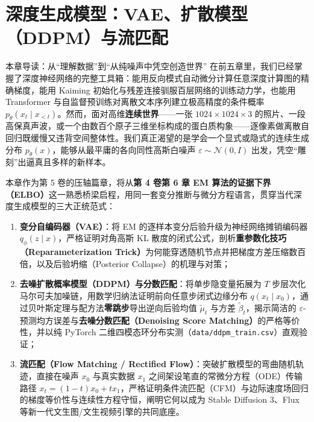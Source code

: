 \chapter[深度生成：VAE、扩散与流匹配]{深度生成模型：VAE、扩散模型（DDPM）与流匹配}
\label{ch:vae-diffusion-flow}


\begin{chapIntro}{本章导读：从“理解数据”到“从纯噪声中凭空创造世界”}
在前五章里，我们已经掌握了深度神经网络的完整工具箱：能用反向模式自动微分计算任意深度计算图的精确梯度，能用 Kaiming 初始化与残差连接驯服百层网络的训练动力学，也能用 Transformer 与自监督预训练对离散文本序列建立极高精度的条件概率 $p_\theta(x_t \mid x_{<t})$。然而，面对高维\textbf{连续世界}——一张 $1024 \times 1024 \times 3$ 的照片、一段高保真声波，或一个由数百个原子三维坐标构成的蛋白质构象——逐像素做离散自回归既缓慢又违背空间整体性。我们真正渴望的是学会一个显式或隐式的连续生成分布 $p_\theta(x)$，能够从最平庸的各向同性高斯白噪声 $\varepsilon \sim \mathcal{N}(0, I)$ 出发，凭空“雕刻”出逼真且多样的新样本。

本章作为第 5 卷的压轴篇章，将从\textbf{第 4 卷第 6 章 EM 算法的证据下界（ELBO）}这一熟悉桥梁启程，用同一套变分推断与微分方程语言，贯穿当代深度生成模型的三大正统范式：
\begin{enumerate}
  \item \textbf{变分自编码器（VAE）}：将 EM 的逐样本变分后验升级为神经网络摊销编码器 $q_\phi(z \mid x)$，严格证明对角高斯 KL 散度的闭式公式，剖析\textbf{重参数化技巧（Reparameterization Trick）}为何能穿透随机节点并把梯度方差压缩数百倍，以及后验坍缩（Posterior Collapse）的机理与对策；
  \item \textbf{去噪扩散概率模型（DDPM）与分数匹配}：将单步隐变量拓展为 $T$ 步层次化马尔可夫加噪链，用数学归纳法证明前向任意步闭式边缘分布 $q(x_t \mid x_0)$，通过贝叶斯定理与配方法\textbf{零跳步}导出逆向后验均值 $\tilde{\mu}_t$ 与方差 $\tilde{\beta}_t$，揭示简洁的 $\varepsilon$-预测均方误差与\textbf{去噪分数匹配（Denoising Score Matching）}的严格等价性，并以纯 PyTorch 二维四模态环分布实测（\texttt{data/ddpm\_train.csv}）直观验证；
  \item \textbf{流匹配（Flow Matching / Rectified Flow）}：突破扩散模型的弯曲随机轨迹，直接在噪声 $x_0$ 与真实数据 $x_1$ 之间架设笔直的常微分方程（ODE）传输路径 $x_t = (1-t)x_0 + t x_1$，严格证明条件流匹配（CFM）与边际速度场回归的梯度等价性与连续性方程守恒，阐明它何以成为 Stable Diffusion 3、Flux 等新一代文生图/文生视频引擎的共同底座。
\end{enumerate}
\end{chapIntro}

